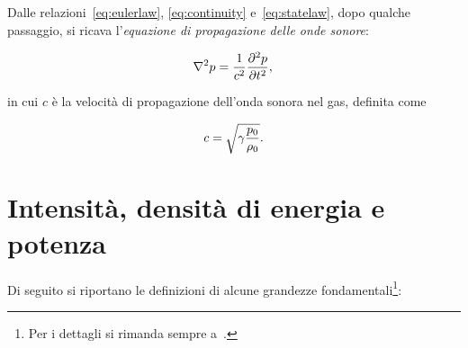 Dalle relazioni~\ref{eq:eulerlaw}, \ref{eq:continuity} e~\ref{eq:statelaw}, dopo qualche passaggio, si
ricava l'\emph{equazione di propagazione delle onde sonore}:

\begin{equation}
  \label{eq:wavelaw}
  \nabla^2 p = \frac{1}{c^2} \frac{\partial^2 p}{\partial t^2},\\
\end{equation}

in cui $c$ \`e la velocit\`a di propagazione dell'onda sonora nel gas, definita come

\begin{equation}
  \label{eq:soundspeed}
  c = \sqrt{\gamma \frac{p_0}{\rho_0}}.\\
\end{equation}



\section{Intensit\`a, densit\`a di energia e potenza}
\label{sec:power}

Di seguito si riportano le definizioni di alcune grandezze fondamentali\footnote{ Per i dettagli si
    rimanda sempre a~\cite{amea}.}:

